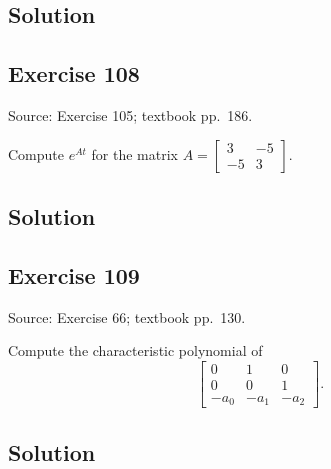 \documentclass[12pt,a4paper]{article}
\newlength{\questionroom}
\newenvironment{questionprompt}{%
  \begin{lrbox}{\questionbox}\begin{minipage}{\linewidth}%
}{%
  \end{minipage}\end{lrbox}%
  \setlength{\questionroom}{\dimexpr\ht\questionbox+\dp\questionbox+5.2cm\relax}%
  \ifdim\questionroom>\textheight\setlength{\questionroom}{\textheight}\fi
  \Needspace{\questionroom}%
  \noindent\usebox{\questionbox}\par
}
\begin{document}
\subsection*{Solution}
\vspace{3.5cm}


\begin{questionprompt}
\section*{Exercise 108}
\label{practice:108}
{\small Source: Exercise 105; textbook pp.~186.}\par
Compute $e^{At}$ for the matrix $A=\begin{bmatrix}3&-5\\-5&3\end{bmatrix}$.
\end{questionprompt}
\subsection*{Solution}
\vspace{3.5cm}


\begin{questionprompt}
\section*{Exercise 109}
\label{practice:109}
{\small Source: Exercise 66; textbook pp.~130.}\par
Compute the characteristic polynomial of
\[\begin{bmatrix}0&1&0\\0&0&1\\-a_0&-a_1&-a_2\end{bmatrix}.\]
\end{questionprompt}
\subsection*{Solution}
\vspace{3.5cm}
\end{document}
